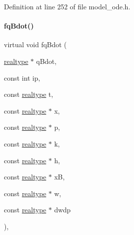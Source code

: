Definition at line 252 of file model\+\_\+ode.\+h.

\mbox{\label{classamici_1_1_model___o_d_e_a3eb796dbb29fd20c70366fb642c2a1e3}} 
\paragraph{\texorpdfstring{fq\+Bdot()}{fqBdot()}\hspace{0.1cm}{\footnotesize\ttfamily [2/2]}}
{\footnotesize\ttfamily virtual void fq\+Bdot (\begin{DoxyParamCaption}\item[{\mbox{\hyperlink{namespaceamici_a1bdce28051d6a53868f7ccbf5f2c14a3}{realtype}} $\ast$}]{q\+Bdot,  }\item[{const int}]{ip,  }\item[{const \mbox{\hyperlink{namespaceamici_a1bdce28051d6a53868f7ccbf5f2c14a3}{realtype}}}]{t,  }\item[{const \mbox{\hyperlink{namespaceamici_a1bdce28051d6a53868f7ccbf5f2c14a3}{realtype}} $\ast$}]{x,  }\item[{const \mbox{\hyperlink{namespaceamici_a1bdce28051d6a53868f7ccbf5f2c14a3}{realtype}} $\ast$}]{p,  }\item[{const \mbox{\hyperlink{namespaceamici_a1bdce28051d6a53868f7ccbf5f2c14a3}{realtype}} $\ast$}]{k,  }\item[{const \mbox{\hyperlink{namespaceamici_a1bdce28051d6a53868f7ccbf5f2c14a3}{realtype}} $\ast$}]{h,  }\item[{const \mbox{\hyperlink{namespaceamici_a1bdce28051d6a53868f7ccbf5f2c14a3}{realtype}} $\ast$}]{xB,  }\item[{const \mbox{\hyperlink{namespaceamici_a1bdce28051d6a53868f7ccbf5f2c14a3}{realtype}} $\ast$}]{w,  }\item[{const \mbox{\hyperlink{namespaceamici_a1bdce28051d6a53868f7ccbf5f2c14a3}{realtype}} $\ast$}]{dwdp }\end{DoxyParamCaption})\hspace{0.3cm}{\ttfamily [protected]}, {\ttfamily [virtual]}}

